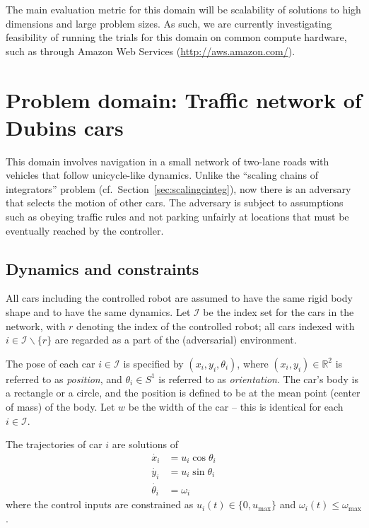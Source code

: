 \documentclass{amsart}
\theoremstyle{definition}
\begin{document}
The main evaluation metric for this domain will be scalability of solutions to
high dimensions and large problem sizes. As such, we are currently investigating
feasibility of running the trials for this domain on common compute hardware,
such as through Amazon Web Services (\url{http://aws.amazon.com/}).


\section{Problem domain: Traffic network of Dubins cars}\label{sec:trafficdubins}

This domain involves navigation in a small network of two-lane roads with
vehicles that follow unicycle-like dynamics. Unlike the ``scaling
chains of integrators'' problem (cf.\ Section~\ref{sec:scalingcinteg}), now
there is an adversary that selects the motion of other cars.  The adversary is
subject to assumptions such as obeying traffic rules and not parking unfairly at
locations that must be eventually reached by the controller.

\subsection{Dynamics and constraints}
All cars including the controlled robot are assumed to have the same rigid body
shape and to have the same dynamics. Let $\mathcal I$ be the index set for the
cars in the network, with $r$ denoting the index of the controlled robot; all
cars indexed with $i \in {\mathcal I}\backslash\{r\}$ are regarded as a part of
the (adversarial) environment.

The pose of each car $i \in {\mathcal I}$ is specified by $(x_i,y_i,\theta_i)$,
where $(x_i,y_i)\in \mathbb{R}^2$ is referred to as \textit{position}, and
$\theta_i \in S^1$ is referred to as \textit{orientation}.  The car's body is a
rectangle or a circle, and the position is defined to be at the mean point
(center of mass) of the body.  Let $w$ be the width of the car -- this is
identical for each $i \in {\mathcal I}$.

The trajectories of car $i$ are solutions of
\begin{align}
\dot{x_i} &= u_i \cos \theta_i \\
\dot{y_i} &= u_i \sin \theta_i \\
\dot{\theta_i} &= \omega_i
\end{align}
where the control inputs are constrained as $u_i(t)\in \{0,u_{\mathrm{max}}\}$ and
$\omega_i(t) \leq \omega_{\mathrm{max}}$.
\end{document}
